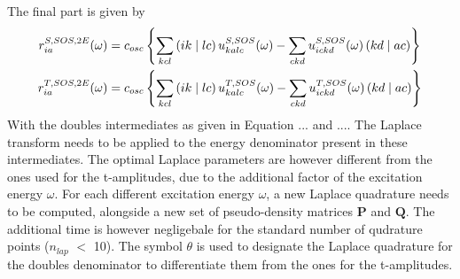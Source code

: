 The final part is given by
\begin{align}
r_{ia}^{S,SOS,2E}(\omega) &= c_{osc} \left\lbrace \sum_{kcl} \left( ik \mid lc \right) u^{S,SOS}_{kalc}(\omega) - \sum_{ckd} u^{S,SOS}_{ickd}(\omega) \left( kd \mid ac \right) \right\rbrace  \\
r_{ia}^{T,SOS,2E}(\omega) &= c_{osc} \left\lbrace \sum_{kcl} \left( ik \mid lc \right) u^{T,SOS}_{kalc}(\omega) - \sum_{ckd} u^{T,SOS}_{ickd}(\omega) \left( kd \mid ac \right) \right\rbrace
\end{align}
\noindent With the doubles intermediates as given in Equation ... and .... The Laplace transform needs to be applied to the energy denominator present in these intermediates. The optimal Laplace parameters are however different from the ones used for the t-amplitudes, due to the additional factor of the excitation energy $\omega$. For each different excitation energy $\omega$, a new Laplace quadrature needs to be computed, alongside a new set of pseudo-density matrices $\mathbf{P}$ and $\mathbf{Q}$. The additional time is however negligebale for the standard number of qudrature points ($n_{lap}$ $<$ 10). The symbol $\theta$ is used to designate the Laplace quadrature for the doubles denominator to differentiate them from the ones for the t-amplitudes. 

